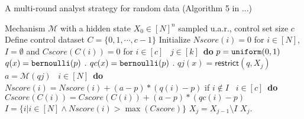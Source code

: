 \clearpage
\begin{algorithm}
\footnotesize
\caption{A multi-round analyst strategy for random data (Algorithm 5 in ...)}
\label{alg:multiRound}
\begin{algorithmic}
\REQUIRE Mechanism $\mathcal{M}$ with a hidden state $X_0 \in [N]^{n}$ sampled u.a.r., control set size $c$
\STATE Define control dataset $C = \{0,1, \cdots, c - 1\}$
\STATE Initialize $Nscore(i) = 0$ for $i \in [N]$, $I = \emptyset$ and $Cscore(C(i)) = 0$ for $i \in [c]$
\ $j\in [k]$\ {\bf do} 
\STATE {} $p=\mathtt{uniform}(0,1)$ 
\STATE {} $q (x) = \mathtt{bernoulli} ( p )$ .
\STATE {} $qc (x) = \mathtt{bernoulli} ( p )$ .
\STATE {} $qj(x) = \mathsf{restrict}(q, X_j)$
\STATE {} $a = \mathcal{M}(qj)$ 
\STATE {}\ $i \in [N]$\ {\bf do}
\STATE \qquad \qquad $Nscore(i) = Nscore(i) + (a - p)*(q (i) - p)$ if $i \notin I$
\STATE {}\ $i \in [c]$\ {\bf do}
\STATE \qquad \qquad $Cscore(C(i)) = Cscore(C(i)) + (a - p)*(qc (i) - p)$
\STATE {} $I = \{i | i\in [N] \land Nscore(i) > \max(Cscore)\}$
\STATE {} $X_j = X_{j - 1} \setminus I$ 
\RETURN $X_j$.
\end{algorithmic}
\end{algorithm}



